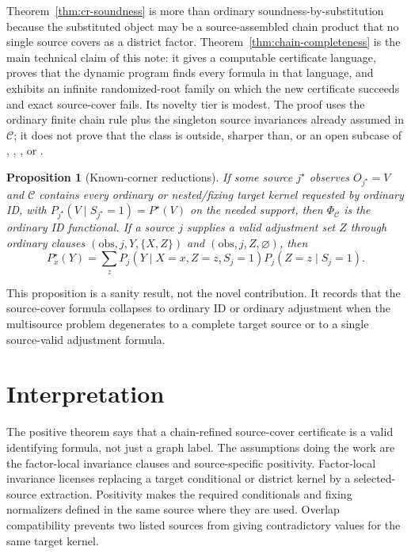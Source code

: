 \documentclass[11pt]{article}
\theoremstyle{definition}
\theoremstyle{plain}
\newtheorem{proposition}{Proposition}
\theoremstyle{remark}
\begin{document}
Theorem~\ref{thm:cr-soundness} is more than ordinary soundness-by-substitution
because the substituted object may be a source-assembled chain product that
no single source covers as a district factor.  Theorem~\ref{thm:chain-completeness}
is the main technical claim of this note: it gives a computable certificate
language, proves that the dynamic program finds every formula in that
language, and exhibits an infinite randomized-root family on which the new
certificate succeeds and exact source-cover fails.  Its novelty tier is
modest.  The proof uses the ordinary finite chain rule plus the singleton
source invariances already assumed in \(\mathcal C\); it does not prove that
the class is outside, sharper than, or an open subcase of
\cite{LeeGhassamiShpitser2024DataFusionSelection},
\cite{TikkaHyttinenKarvanen2021DoSearch},
\cite{LeeCorreaBareinboim2020GID}, or
\cite{KivvaMokhtarianEtesamiKiyavash2022RevisitGID}.

\begin{proposition}[Known-corner reductions]\label{prop:reductions}
If some source \(j^\star\) observes \(O_{j^\star}=V\) and \(\mathcal C\)
contains every ordinary or nested/fixing target kernel requested by ordinary
ID, with \(P_{j^\star}(V\mid S_{j^\star}=1)=P^\star(V)\) on the needed
support, then \(\Phi_{\mathcal C}\) is the ordinary ID functional.  If a
source \(j\) supplies a valid adjustment set \(Z\) through ordinary clauses
\((\mathrm{obs},j,Y,\{X,Z\})\) and \((\mathrm{obs},j,Z,\varnothing)\), then
\[
  P^\star_x(Y)
  =
  \sum_z P_j(Y\mid X=x,Z=z,S_j=1)P_j(Z=z\mid S_j=1).
\]
\end{proposition}

This proposition is a sanity result, not the novel contribution.  It records
that the source-cover formula collapses to ordinary ID or ordinary adjustment
when the multisource problem degenerates to a complete target source or to a
single source-valid adjustment formula.

\section{Interpretation}
The positive theorem says that a chain-refined source-cover certificate is a
valid identifying formula, not just a graph label.  The assumptions doing the
work are the factor-local invariance clauses and source-specific positivity.
Factor-local invariance licenses replacing a target conditional or district
kernel by a selected-source extraction.  Positivity makes the required
conditionals and fixing normalizers defined in the same source where they are
used.  Overlap compatibility prevents two listed sources from giving
contradictory values for the same target kernel.
\end{document}

